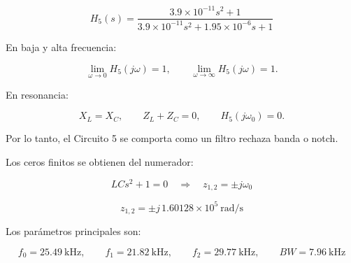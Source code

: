 \begin{equation}
    \boxed{
    H_5(s)=
    \frac{3.9\times10^{-11}s^2+1}
    {3.9\times10^{-11}s^2+1.95\times10^{-6}s+1}
    }
\end{equation}

En baja y alta frecuencia:

\begin{equation}
    \lim_{\omega\to0}H_5(j\omega)=1,
    \qquad
    \lim_{\omega\to\infty}H_5(j\omega)=1.
\end{equation}

En resonancia:

\begin{equation}
    X_L=X_C,
    \qquad
    Z_L+Z_C=0,
    \qquad
    H_5(j\omega_0)=0.
\end{equation}

Por lo tanto, el Circuito 5 se comporta como un filtro rechaza banda o notch.

Los ceros finitos se obtienen del numerador:

\begin{equation}
    LCs^2+1=0
    \quad\Rightarrow\quad
    \boxed{
    z_{1,2}=\pm j\omega_0
    }
\end{equation}

\begin{equation}
    \boxed{
    z_{1,2}=\pm j\,1.60128\times10^5\ \mathrm{rad/s}
    }
\end{equation}

Los parámetros principales son:

\begin{equation}
    \boxed{
    f_0=\SI{25.49}{\kilo\hertz},
    \qquad
    f_1=\SI{21.82}{\kilo\hertz},
    \qquad
    f_2=\SI{29.77}{\kilo\hertz},
    \qquad
    BW=\SI{7.96}{\kilo\hertz}
    }
\end{equation}

\begin{table}[H]
\centering
\caption{$H_5(s)$}
\label{tab:circuito5_parametros}
\end{table}


